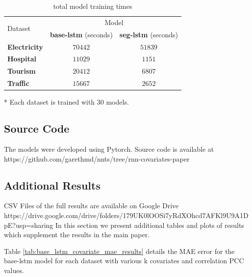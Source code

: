 \documentclass[letterpaper]{article}
\begin{document}
\begin{table}[tbp]
  \caption{total model training times}
  \centering
  \begin{threeparttable}
  \begin{small}
  \renewcommand{\multirowsetup}{\centering}
  \setlength{\tabcolsep}{8pt}
  \begin{tabular}{lcc}
    \toprule
    \multirow{2}{*}{Dataset} & \multicolumn{2}{c}{Model} \\
    \cmidrule{2-3}
     & \textbf{base-lstm} (seconds) & \textbf{seg-lstm} (seconds)\\
    \midrule
    \multirow{1}{*}{\textbf{Electricity}} & $70442$ & $51839$ \\
    \midrule
    \multirow{1}{*}{\textbf{Hospital}} & $11029$ & $1151$ \\
    \midrule
    \multirow{1}{*}{\textbf{Tourism}} & $20412$ & $6807$ \\
    \midrule
    \multirow{1}{*}{\textbf{Traffic}} & $15667$ & $2652$ \\
    \bottomrule
  \end{tabular}
  \begin{tablenotes}
    \item[*] Each dataset is trained with 30 models.
  \end{tablenotes}
  \end{small}
  \end{threeparttable}
  \vspace{-15pt}
  \label{tab:training_time}
\end{table}

\subsection{Source Code}
The models were developed using Pytorch. Source code is available at \\
https://github.com/garethmd/nnts/tree/rnn-covariates-paper
\FloatBarrier

\subsection{Additional Results}
CSV Files of the full results are available on Google Drive \\
https://drive.google.com/drive/folders/179UK0lOOSi7yRdXOhcd7AFKl9U9A1DpE?usp=sharing
In this section we present additional tables and plots of results which supplement the results in the main paper. 

Table \ref{tab:base_lstm_covariate_mae_results} details
the MAE error for the base-lstm model for each dataset with various k covariates and correlation PCC values.  
\end{document}
